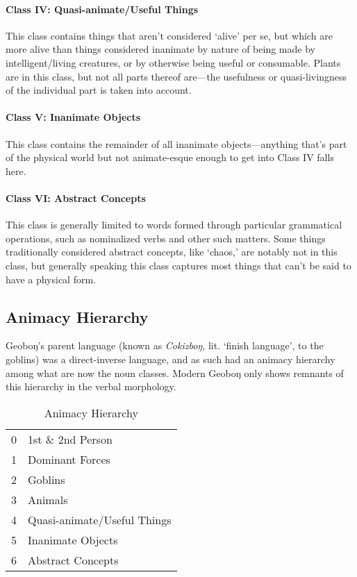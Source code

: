 \documentclass[a4paper,11pt,oneside,openany]{memoir}
\newcommand{\engma}{ŋ}
\begin{document}
\paragraph{Class IV: Quasi-animate/Useful Things}

This class contains things that aren't considered `alive' per se, but which are more alive than things considered inanimate by nature of being made by intelligent/living creatures, or by otherwise being useful or consumable. Plants are in this class, but not all parts thereof are---the usefulness or quasi-livingness of the individual part is taken into account.

\paragraph{Class V: Inanimate Objects}

This class contains the remainder of all inanimate objects---anything that's part of the physical world but not animate-esque enough to get into Class IV falls here.

\paragraph{Class VI: Abstract Concepts}

This class is generally limited to words formed through particular grammatical operations, such as nominalized verbs and other such matters. Some things traditionally considered abstract concepts, like `chaos,' are notably not in this class, but generally speaking this class captures most things that can't be said to have a physical form.

\subsection{Animacy Hierarchy}

Geobo{\engma}'s parent language (known as \textit{Cokizbo\engma}, lit. `finish language', to the goblins) was a direct-inverse language, and as such had an animacy hierarchy among what are now the noun classes. Modern Geobo{\engma} only shows remnants of this hierarchy in the verbal morphology.

\begin{table}[h]
    \centering
    \begin{tabular}{@{}rl@{}}
    \toprule
0 & 1st \& 2nd Person \\
1 & Dominant Forces \\
2 & Goblins \\
3 & Animals \\
4 & Quasi-animate/Useful Things \\
5 & Inanimate Objects \\
6 & Abstract Concepts \\
\bottomrule
\end{tabular}
    \caption{Animacy Hierarchy}
    \label{tab:anim}
\end{table}
\end{document}
